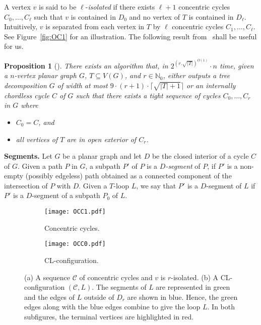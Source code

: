 \documentclass{article}
\newtheorem{proposition}[theorem]{Proposition}
\numberwithin{claimcounter}{lemma}
\begin{document}
A vertex $v$ is said to be $\ell$-\textit{isolated} if there exists $\ell+1$ concentric cycles $C_0,\ldots,C_\ell$ such that $v$ is contained in $D_0$ and no vertex of $T$ is contained in $D_{\ell}$. Intuitively, $v$ is separated from each vertex in $T$ by $\ell$ concentric cycles $C_1,\ldots,C_\ell$. See Figure~\ref{fig:OC1} for an illustration. The following result from~\cite{JCTB} shall be useful for us.
\begin{proposition}[\cite{JCTB}]\label{P:jctb}
    There exists an algorithm that, in $2^{(r.\sqrt{|T|})^{O(1)}}\cdot n$ time, given a $n$-vertex planar graph $G$, $T\subseteq V(G)$, and $r\in \mathbb{N}_0$, either outputs a tree decomposition $G$ of width at most $9\cdot(r+1)\cdot \lceil \sqrt{|T|+1}\rceil$ or an internally chordless cycle $C$ of $G$ such that there exists a tight sequence of cycles $C_0,\ldots,C_r$ in $G$ where
    \begin{itemize}
        \item $C_0 = C$, and
        \item all vertices of $T$ are in open exterior of $C_r$.
    \end{itemize}
\end{proposition}



\medskip
\noindent\textbf{Segments.}
Let $G$ be a planar graph and let $D$ be the closed interior of a cycle $C$ of $G$. Given a path $P$ in $G$, a subpath $P'$ of $P$ is a {\em $D$-segment} of $P$, if $P'$ is a non-empty (possibly edgeless) path obtained as a connected component of the intersection of $P$ with $D$. Given a $T$-loop $L$, we say that $P'$ is a $D$-segment of $L$ if $P'$ is a $D$-segment of a subpath $P_0$ of $L$. 

\begin{figure}
\centering
\begin{subfigure}{.5\textwidth}
  \centering
  \captionsetup{justification=centering}
  \texttt{[image: OCC1.pdf]}
  \caption{Concentric cycles.}
  \label{fig:OC1M}
\end{subfigure}\begin{subfigure}{.5\textwidth}
  \centering
  \captionsetup{justification=centering}
  \texttt{[image: OCC0.pdf]}
  \caption{CL-configuration.}
  \label{fig:OC2M}
\end{subfigure}
\caption{(a) A sequence $\mathcal{C}$  of concentric cycles and $v$ is $r$-isolated. (b) A CL-configuration $(\mathcal{C},L)$. The segments of $L$ are represented in  green and the edges of $L$ outside of $D_r$ are shown in blue. Hence, the green edges along with the blue edges combine to give the loop $L$. In both subfigures, the terminal vertices are highlighted in red.} 
\label{fig:testM}
\end{figure}
\end{document}
